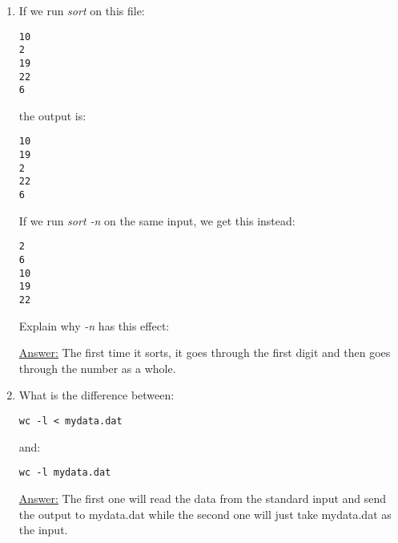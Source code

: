 \documentclass[12pt]{article}
\begin{document}
\begin{enumerate}
\item If we run \emph{sort} on this file:
\begin{flushleft}
\texttt{10 \\ 2 \\ 19 \\ 22 \\ 6}
\end{flushleft}
the output is:
\begin{flushleft}
\texttt{10 \\ 19 \\ 2 \\ 22 \\ 6}
\end{flushleft}
If we run \emph{sort -n} on the same input, we get this instead:
\begin{flushleft}
\texttt{2 \\ 6 \\ 10 \\ 19 \\ 22}
\end{flushleft}
Explain why \emph{-n} has this effect:
\begin{center}
\textsf{\underline{Answer:} The first time it sorts, it goes through the first digit and then goes through the number as a whole.}
\end{center}

\item What is the difference between:
\begin{flushleft}
\texttt{wc -l < mydata.dat}
\end{flushleft}
and:
\begin{flushleft}
\texttt{wc -l mydata.dat}
\end{flushleft}
\begin{center}
\textsf{\underline{Answer:} The first one will read the data from the standard input and send the output to mydata.dat while the second one will just take mydata.dat as the input.}
\end{center}

\end{enumerate}
\end{document}
